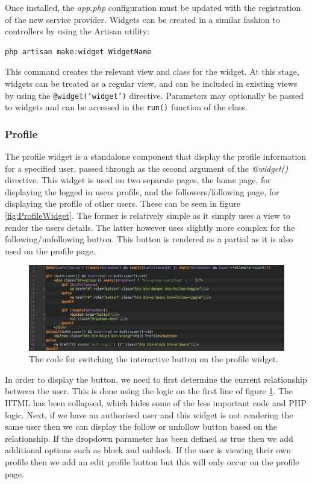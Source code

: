 Once installed, the \textit{app.php} configuration must be updated with the registration of the new service provider. Widgets can be created in a similar fashion to controllers by using the Artisan utility:

\begin{lstlisting}[language=php]
 php artisan make:widget WidgetName
\end{lstlisting}

This command creates the relevant view and class for the widget. At this stage, widgets can be treated as a regular view, and can be included in existing views by using the \texttt{@widget(`widget')} directive. Parameters may optionally be passed to widgets and can be accessed in the \texttt{run()} function of the class.

\subsubsection{Profile}
The profile widget is a standalone component that display the profile information for a specified user, passed through as the second argument of the \textit{@widget()} directive. This widget is used on two separate pages, the home page, for displaying the logged in users profile, and the followers/following page, for displaying the profile of other users. These can be seen in figure \ref{fig:ProfileWidget}. The former is relatively simple as it simply uses a view to render the users details. The latter however uses slightly more complex for the following/unfollowing button. This button is rendered as a partial as it is also used on the profile page.

\begin{figure}[H]
	\centering
	\includegraphics[width=\textwidth]{Images/Implementation/UI/Widgets/Profile_Follow}
	\caption{The code for switching the interactive button on the profile widget.}
	\label{fig:Profile_Follow}
\end{figure}

In order to display the button, we need to first determine the current relationship between the user. This is done using the logic on the first line of figure \ref{fig:Profile_Follow}. The HTML has been collapsed, which hides some of the less important code and PHP logic. Next, if we have an authorised user and this widget is not rendering the same user then we can display the follow or unfollow button based on the relationship. If the dropdown parameter has been defined as true then we add additional options such as block and unblock. If the user is viewing their own profile then we add an edit profile button but this will only occur on the profile page.

